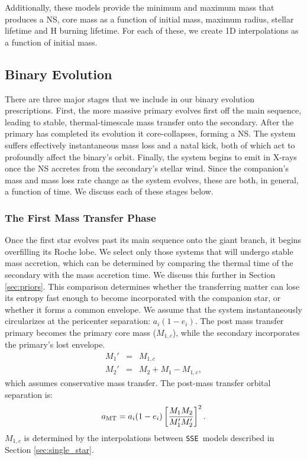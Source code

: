 \documentclass[12pt, preprint]{aastex}
\newcommand{\sse}{{\tt SSE}}
\begin{document}
Additionally, these models provide the minimum and maximum mass that produces a NS, core mass as a function of initial mass, maximum radius, stellar lifetime and H burning lifetime. For each of these, we create 1D interpolations as a function of initial mass.



\subsection{Binary Evolution} \label{sec:binary_evolve}

There are three major stages that we include in our binary evolution prescriptions. First, the more massive primary evolves first off the main sequence, leading to stable, thermal-timescale mass transfer onto the secondary. After the primary has completed its evolution it core-collapses, forming a NS. The system suffers effectively instantaneous mass loss and a natal kick, both of which act to profoundly affect the binary's orbit. Finally, the system begins to emit in X-rays once the NS accretes from the secondary's stellar wind. Since the companion's mass and mass loss rate change as the system evolves, these are both, in general, a function of time. We discuss each of these stages below.


\subsubsection{The First Mass Transfer Phase} \label{sec:trans_MT}

Once the first star evolves past its main sequence onto the giant branch, it begins overfilling its Roche lobe. We select only those systems that will undergo stable mass accretion, which can be determined by comparing the thermal time of the secondary with the mass accretion time. We discuss this further in Section \ref{sec:priors}. This comparison determines whether the transferring matter can lose its entropy fast enough to become incorporated with the companion star, or whether it forms a common envelope. We assume that the system instantaneously circularizes at the pericenter separation: $a_i (1-e_i)$. The post mass transfer primary becomes the primary core mass ($M_{1,c}$), while the secondary incorporates the primary's lost envelope. 
\begin{eqnarray} 
M_1' &=& M_{1,c} \\
M_2' &=& M_2 + M_1 - M_{1,c},
\end{eqnarray}
which assumes conservative mass transfer. The post-mass transfer orbital separation is:
\begin{equation}
a_{\rm MT} = a_i (1-e_i) \left[ \frac{M_1 M_2}{M_1' M_2'} \right]^2.
\end{equation}
$M_{1,c}$ is determined by the interpolations between \sse\ models described in Section \ref{sec:single_star}.
\end{document}
